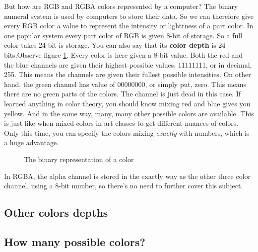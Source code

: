 But how are RGB and RGBA colors represented by a computer? The binary
numeral system is used by computers to store their data. So we can
therefore give every RGB color a value to represent the intensity or
lighttness of a part color. In one popular system every part color of
RGB is given 8-bit of storage. So a full color takes 24-bit is
storage. You can also say that its \textbf{color depth}
 is 24-bits.Observe figure \ref{fig:rgb-bits}. Every color is
here given a 8-bit value. Both the red and the blue channels are given
their highest possible values, 11111111, or in decimal, 255. This
means the channels are given their fullest possible intensities. On
other hand, the green channel has value of 00000000, or simply put,
zero. This means there are no green parts of the colors. The channel
is just dead in this case. If learned anything in color theory, you
should know mixing red and blue gives you yellow. And in the same way,
many, many other possible colors are available. This is just like when
mixed colors in art classes to get different nuances of colors. Only
this time, you can specify the colors mixing \emph{exactly} with
numbers, which is a huge advantage.
\cite{puglia00:_handbook_dig_proj}

\begin{figure}[h]
  \centering
  \newcommand{\bitbox}[3]{
    \filldraw[fill=#2!80!white,draw=black] (#1,0) +(-.2,-.2) rectangle ++(.2,.2);
    \draw (#1,0) node{#3};
  }
  \caption{The binary representation of a color}
  \label{fig:rgb-bits}
\end{figure}


In RGBA, the alpha channel is stored in the exactly way as the other
three color channel, using a 8-bit number, so there's no need to
further cover this subject.

\subsection{Other colors depths}
\label{sec:other-colors-depths}

\subsection{How many possible colors?}
\label{sec:how-many-possible-colors}


